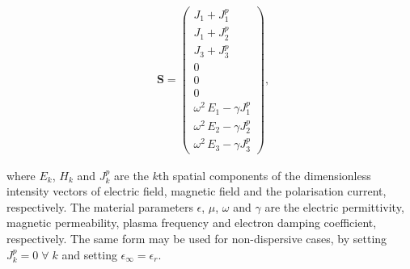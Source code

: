 \begin{equation*}
\begin{array}{ccccc}
    &
\mathbf{S} = \begin{pmatrix} J_1 + J^p_1 \\ J_1 + J^p_2 \\ J_3 + J^p_3 \\ 0 \\ 0 \\ 0 \\ \omega^2 \, E_1 - \gamma J^p_1 \\  \omega^2 \, E_2 - \gamma J^p_2 \\ \omega^2 \, E_3 - \gamma J^p_3 \end{pmatrix} ,
\end{array}
\:
\end{equation*}

where $E_k$, $H_k$ and $J^p_k$ are the $k$th spatial components of the dimensionless intensity vectors of electric field, magnetic field and the polarisation current, respectively. The material parameters $\epsilon$, $\mu$, $\omega$ and $\gamma$ are the electric permittivity, magnetic permeability, plasma frequency and electron damping coefficient, respectively. The same form may be used for non-dispersive cases, by setting $J^p_k = 0 \; \forall \; k$ and setting $\epsilon_{\infty} = \epsilon_{r}$.
%





